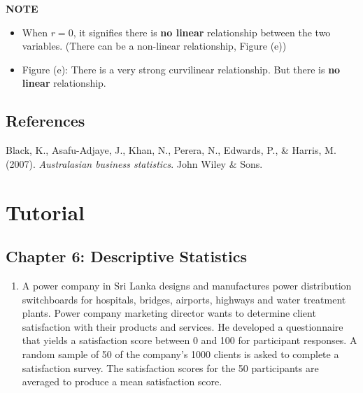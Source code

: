 \documentclass[]{book}
\providecommand{\tightlist}{%
  \setlength{\itemsep}{0pt}\setlength{\parskip}{0pt}}
\begin{document}
\textbf{NOTE}

\begin{itemize}
\tightlist
\item
  When \(r=0\), it signifies there is \textbf{no linear} relationship between the two variables. (There can be a non-linear relationship, Figure (e))
\item
  Figure (e): There is a very strong curvilinear relationship. But there is \textbf{no linear} relationship.
\end{itemize}

\hypertarget{references}{%
\subsection*{References}\label{references}}

Black, K., Asafu-Adjaye, J., Khan, N., Perera, N., Edwards, P., \& Harris, M. (2007). \emph{Australasian business statistics}. John Wiley \& Sons.

\newpage


\hypertarget{tutorial-1}{%
\section{Tutorial}\label{tutorial-1}}

\hypertarget{chapter-6-descriptive-statistics}{%
\subsection*{Chapter 6: Descriptive Statistics}\label{chapter-6-descriptive-statistics}}

\begin{enumerate}
\def\labelenumi{\arabic{enumi}.}
\tightlist
\item
  A power company in Sri Lanka designs and manufactures power distribution switchboards for hospitals, bridges, airports, highways and water treatment plants. Power company marketing director wants to determine client satisfaction with their products and services. He developed a questionnaire that yields a satisfaction score between 0 and 100 for participant responses. A random sample of 50 of the company's 1000 clients is asked to complete a satisfaction survey. The satisfaction scores for the 50 participants are averaged to produce a mean satisfaction score.
\end{enumerate}
\end{document}
